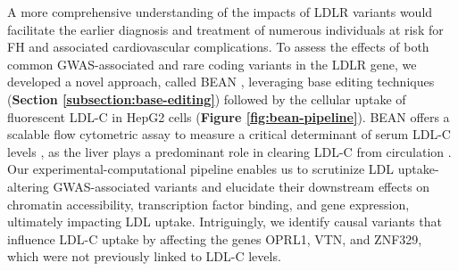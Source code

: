 \documentclass[a4paper, titlepage, openright]{book}
\begin{document}
%
A more comprehensive understanding of the impacts of LDLR variants would facilitate the earlier diagnosis and treatment of numerous individuals at risk for FH and associated cardiovascular complications. To assess the effects of both common GWAS-associated and rare coding variants in the LDLR gene, we developed a novel approach, called BEAN \citep{ryu2023joint}, leveraging base editing techniques (\textbf{Section \ref{subsection:base-editing}}) followed by the cellular uptake of fluorescent LDL-C in HepG2 cells (\textbf{Figure \ref{fig:bean-pipeline}}). BEAN offers a scalable flow cytometric assay to measure a critical determinant of serum LDL-C levels \citep{hamilton2023systematic}, as the liver plays a predominant role in clearing LDL-C from circulation \citep{spady1992hepatic}. Our experimental-computational pipeline enables us to scrutinize LDL uptake-altering GWAS-associated variants and elucidate their downstream effects on chromatin accessibility, transcription factor binding, and gene expression, ultimately impacting LDL uptake. Intriguingly, we identify causal variants that influence LDL-C uptake by affecting the genes OPRL1, VTN, and ZNF329, which were not previously linked to LDL-C levels.

\end{document}
